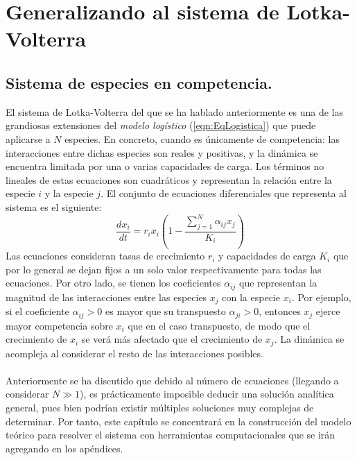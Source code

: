 \chapter{Generalizando al sistema de Lotka-Volterra}

\section{Sistema de especies en competencia.}

\setlength{\parindent}{0cm} El sistema de Lotka-Volterra del que se ha hablado anteriormente es una de las grandiosas extensiones del \textit{modelo logístico} (\ref{eqn:EqLogistica}) que puede aplicarse a $N$ especies. En concreto, cuando es únicamente de competencia: las interacciones entre dichas especies son reales y positivas, y la dinámica se encuentra limitada por una o varias capacidades de carga.  Los términos no lineales de estas ecuaciones son cuadráticos y representan la relación entre la especie $i$ y la especie $j$. El conjunto de ecuaciones diferenciales que representa al sistema es el siguiente:
\begin{equation}\label{eqn:LK}
	\frac{dx_i}{dt}=r_ix_i\left(1-\frac{\sum_{j=1}^N \alpha_{ij}x_j}{K_i}\right)
\end{equation}
Las ecuaciones consideran tasas de crecimiento $r_i$ y capacidades de carga $K_i$ que por lo general se dejan fijos a un solo valor respectivamente para todas las ecuaciones. Por otro lado, se tienen los coeficientes $\alpha_{ij}$ que representan la magnitud de las interacciones entre las especies $x_j$ con la especie $x_i$. Por ejemplo, si el coeficiente $\alpha_{ij}>0$ es mayor que su transpuesto $\alpha_{ji}>0$, entonces $x_j$ ejerce mayor competencia sobre $x_i$ que en el caso transpuesto, de modo que el crecimiento de $x_i$ se verá más afectado que el crecimiento de $x_j$. La dinámica se acompleja al considerar el resto de las interacciones posibles. \\
\\
Anteriormente se ha discutido que debido al número de ecuaciones (llegando a considerar $N \gg 1$), es prácticamente imposible deducir una solución analítica general, pues bien podrían existir múltiples soluciones \cite{CauchyLipschitzTheorem} muy complejas de determinar. Por tanto, este capítulo se concentrará en la construcción del modelo teórico para resolver el sistema con herramientas computacionales que se irán agregando en los apéndices.
